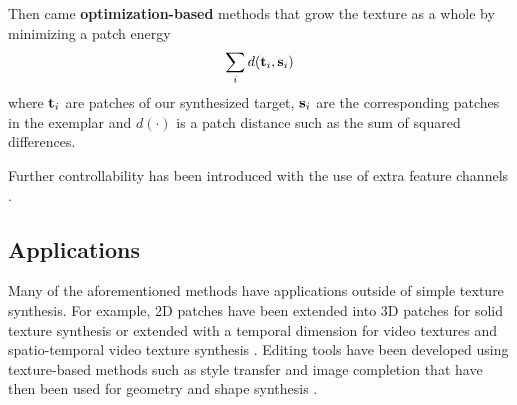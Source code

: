 Then came \textbf{optimization-based} methods \cite{Kwatra05} that grow the texture as a whole by minimizing a patch energy
\begin{equation}
	\sum_i d(\mathbf{t}_i, \mathbf{s}_i)
	\label{eq:patch_energy}
\end{equation}
where $\mathbf{t}_i$ are patches of our synthesized target, $\mathbf{s}_i$ are the corresponding patches in the exemplar and $d(\cdot)$ is a patch distance such as the sum of squared differences.

Further controllability has been introduced with the use of extra feature channels \cite{Ashikhmin01, Matusik05, Lefebvre06, Lu07}.

\subsection{Applications}

Many of the aforementioned methods have applications outside of simple texture synthesis.
For example, 2D patches have been extended into 3D patches for solid texture synthesis \cite{Wei02, Kopf07, Dong08} or extended with a temporal dimension for video textures \cite{Schodl00, Schodl02, Agarwala05} and spatio-temporal video texture synthesis \cite{Kwatra03, Wexler07}.
Editing tools have been developed using texture-based methods such as style transfer \cite{Efros01, Hertzmann01} and image completion \cite{Bertalmio00, Drori03, Hays07} that have then been used for geometry \cite{Bhat04, Zhou06} and shape synthesis \cite{Rosenberger09}.